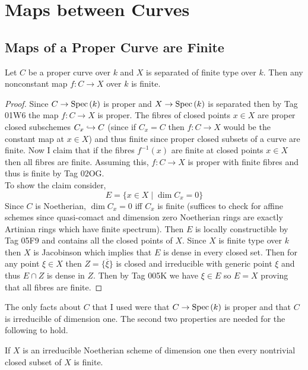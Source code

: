\documentclass[12pt]{article}
\begin{document}
\section{Maps between Curves}


\subsection{Maps of a Proper Curve are Finite}

\begin{theorem}
Let $C$ be a proper curve over $k$ and $X$ is separated of finite type over $k$. Then any nonconstant map $f : C \to X$ over $k$ is finite.
\end{theorem}

\begin{proof}
Since $C \to \mathrm{Spec}\left( k \right)$ is proper and $X \to \mathrm{Spec}\left( k \right)$ is separated then by Tag 01W6 the map $f : C \to X$ is proper. The fibres of closed points $x \in X$ are proper closed subschemes $C_x \hookrightarrow C$ (since if $C_x = C$ then $f : C \to X$ would be the constant map at $x \in X$) and thus finite since proper closed subsets of a curve are finite. Now I claim that if the fibres $f^{-1}(x)$ are finite at closed points $x \in X$ then all fibres are finite. Assuming this, $f : C \to X$ is proper with finite fibres and thus is finite by Tag 02OG.
\bigskip\\
To show the claim consider,
\[ E = \{ x \in X \mid \dim{C_x} = 0 \} \]   
Since $C$ is Noetherian, $\dim{C_x} = 0$ iff $C_x$ is finite (suffices to check for affine schemes since quasi-comact and dimension zero Noetherian rings are exactly Artinian rings which have finite spectrum). Then $E$ is locally constructible by Tag 05F9 and contains all the closed points of $X$. Since $X$ is finite type over $k$ then $X$ is Jacobinson which implies that $E$ is dense in every closed set. Then for any point $\xi \in X$ then $Z = \overline{\{ \xi \}}$ is closed and irreducible with generic point $\xi$ and thus $E \cap Z$ is dense in $Z$. Then by Tag 005K we have $\xi \in E$ so $E = X$ proving that all fibres are finite.
\end{proof}

\begin{remark}
The only facts about $C$ that I used were that $C \to \mathrm{Spec}\left( k \right)$ is proper and that $C$ is irreducible of dimension one. The second two properties are needed for the following to hold.
\end{remark}

\begin{lemma}
If $X$ is an irreducible Noetherian scheme of dimension one then every nontrivial closed subset of $X$ is finite.
\end{lemma}
\end{document}
